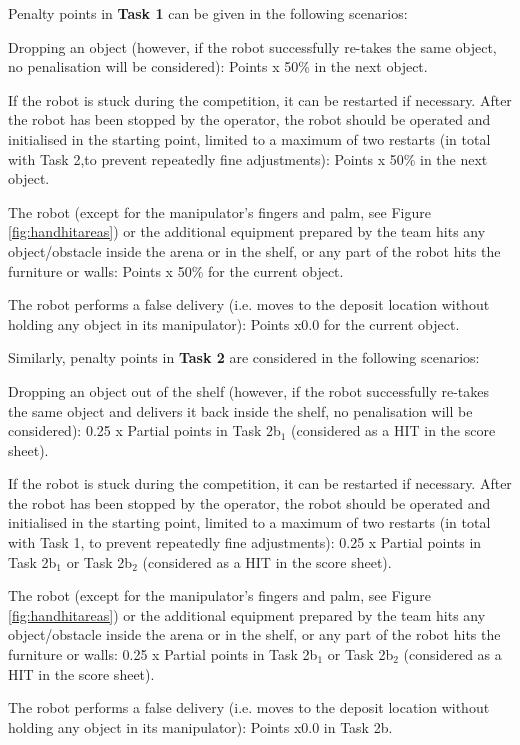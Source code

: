 \documentclass{article}
\newcommand{\SubItem}[1]{
    {\setlength\itemindent{15pt} \item[-] #1}
}
\begin{document}
\begin{itemize}
    \item Penalty points in \textbf{Task 1} can be given in the following scenarios:
        \SubItem{Dropping an object (however, if the robot successfully re-takes the same object, no penalisation will be considered): Points x 50\% in the next object.}
        \SubItem{If the robot is stuck during the competition, it can be restarted if necessary. After the robot has been stopped by the operator, the robot should be operated and initialised in the starting point, limited to a maximum of two restarts  (in total with Task 2,to prevent repeatedly fine adjustments): Points x 50\% in the next object.}
        \SubItem{The robot (except for the manipulator's fingers and palm, see Figure \ref{fig:handhitareas}) or the additional equipment prepared by the team hits any object/obstacle inside the arena or in the shelf, or any part of the robot hits the furniture or walls: Points x 50\% for the current object.}
        \SubItem{The robot performs a false delivery (i.e. moves to the deposit location without holding any object in its manipulator): Points x0.0 for the current object.}
    \item Similarly, penalty points in \textbf{Task 2} are considered in the following scenarios:
        \SubItem{Dropping an object out of the shelf (however, if the robot successfully re-takes the same object and delivers it back inside the shelf, no penalisation will be considered): 0.25 x Partial points in Task 2b$_1$ (considered as a HIT in the score sheet).}
        \SubItem{If the robot is stuck during the competition, it can be restarted if necessary. After the robot has been stopped by the operator, the robot should be operated and initialised in the starting point, limited to a maximum of two restarts (in total with Task 1, to prevent repeatedly fine adjustments): 0.25 x Partial points in Task 2b$_1$ or Task 2b$_2$ (considered as a HIT in the score sheet).}
        \SubItem{The robot (except for the manipulator's fingers and palm, see Figure \ref{fig:handhitareas}) or the additional equipment prepared by the team hits any object/obstacle inside the arena or in the shelf, or any part of the robot hits the furniture or walls: 0.25 x Partial points in Task 2b$_1$ or Task 2b$_2$ (considered as a HIT in the score sheet).}
        \SubItem{The robot performs a false delivery (i.e. moves to the deposit location without holding any object in its manipulator): Points x0.0 in Task 2b.}
\end{itemize}
\end{document}
